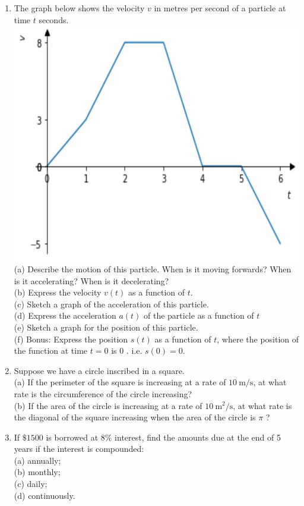\documentclass[10pt]{article}
\begin{document}
\begin{enumerate}
  \item The graph below shows the velocity $v$ in metres per second of a particle at time $t$ seconds.\\
\includegraphics[max width=\textwidth, center]{2024_12_26_56998f94318d3dea0eedg-1}\\
(a) Describe the motion of this particle. When is it moving forwards? When is it accelerating? When is it decelerating?\\
(b) Express the velocity $v(t)$ as a function of $t$.\\
(c) Sketch a graph of the acceleration of this particle.\\
(d) Express the acceleration $a(t)$ of the particle as a function of $t$\\
(e) Sketch a graph for the position of this particle.\\
(f) Bonus: Express the position $s(t)$ as a function of $t$, where the position of the function at time $t=0$ is 0 . i.e. $s(0)=0$.
  \item Suppose we have a circle inscribed in a square.\\
(a) If the perimeter of the square is increasing at a rate of $10 \mathrm{~m} / \mathrm{s}$, at what rate is the circumference of the circle increasing?\\
(b) If the area of the circle is increasing at a rate of $10 \mathrm{~m}^{2} / \mathrm{s}$, at what rate is the diagonal of the square increasing when the area of the circle is $\pi$ ?
  \item If $\$ 1500$ is borrowed at $8 \%$ interest, find the amounts due at the end of 5 years if the interest is compounded:\\
(a) annually;\\
(b) monthly;\\
(c) daily;\\
(d) continuously.
\end{enumerate}
\end{document}

